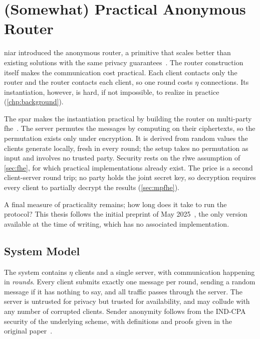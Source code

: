 \section{(Somewhat) Practical Anonymous Router}
\label{sec:spar}
\gls{niar} introduced the anonymous router, a primitive that scales better than existing solutions with the same privacy guarantees~\cite{cryptoeprint:2021/435}. The router construction itself makes the communication cost practical. Each client contacts only the router and the router contacts each client, so one round costs $\eta$ connections. Its instantiation, however, is hard, if not impossible, to realize in practice (\autoref{chp:background}).

The \gls{spar} makes the instantiation practical by building the router on multi-party \gls{fhe}~\cite{cryptoeprint:2025/860}. The server permutes the messages by computing on their ciphertexts, so the permutation exists only under encryption. It is derived from random values the clients generate locally, fresh in every round; the setup takes no permutation as input and involves no trusted party. Security rests on the \gls{rlwe} assumption of \autoref{sec:fhe}, for which practical implementations already exist. The price is a second client-server round trip; no party holds the joint secret key, so decryption requires every client to partially decrypt the results (\autoref{sec:mpfhe}).

A final measure of practicality remains; how long does it take to run the protocol? This thesis follows the initial preprint of May 2025~\cite{cryptoeprint:2025/860}, the only version available at the time of writing, which has no associated implementation.

\subsection{System Model}
\label{sec:spar:model}
The system contains $\eta$ clients and a single server, with communication happening in \emph{rounds}. Every client submits exactly one message per round, sending a random message if it has nothing to say, and all traffic passes through the server. The server is untrusted for privacy but trusted for availability, and may collude with any number of corrupted clients. Sender anonymity follows from the IND-CPA security of the underlying scheme, with definitions and proofs given in the original paper~\cite{cryptoeprint:2025/860}.

